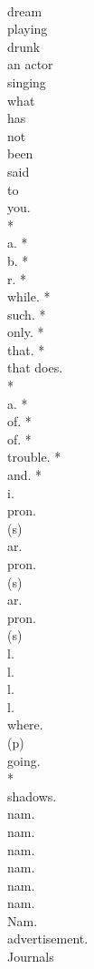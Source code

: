 \documentclass[smalldemyvopaper,11pt,twoside,onecolumn,openright,extrafontsizes]{memoir}
\begin{document}
\\dream
\\playing
\\drunk
\\an actor
\\singing
\\what
\\has
\\not
\\been
\\said
\\to
\\you.
\\*
\\a. *
\\b. *
\\r. *
\\while.     *
\\such.     *
\\only.     *
\\that.     *
\\that does.
\\*
\\a. *
\\of.    *
\\of.    *
\\trouble.     *
\\and.    *
\\i.
\\pron.
\\(s)
\\ar.
\\pron.
\\(s)
\\ar.
\\pron.
\\(s)
\\l.
\\l.
\\l.
\\l.
\\where.
\\(p)
\\going.
\\*
\\shadows.
\\nam.
\\nam.
\\nam.
\\nam.
\\nam.
\\nam.
\\Nam.
\\advertisement.
\\Journals
\end{document}
